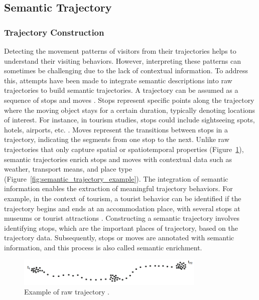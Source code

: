 \documentclass{article}
\begin{document}
\subsection{Semantic Trajectory}

\subsubsection{Trajectory Construction}
Detecting the movement patterns of visitors from their trajectories helps to understand their visiting behaviors. However, interpreting these patterns can sometimes be challenging due to the lack of contextual information. To address this, attempts have been made to integrate semantic descriptions into raw trajectories to build semantic trajectories. A trajectory can be assumed as a sequence of stops and moves \citep{spaccapietra_conceptual_2008}. Stops represent specific points along the trajectory where the moving object stays for a certain duration, typically denoting locations of interest. For instance, in tourism studies, stops could include sightseeing spots, hotels, airports, etc. \citep{yuan_review_2017}. Moves represent the transitions between stops in a trajectory, indicating the segments from one stop to the next. Unlike raw trajectories that only capture spatial or spatiotemporal properties (Figure~\ref{fig:raw_trajectory_example}), semantic trajectories enrich stops and moves with contextual data such as weather, transport means, and place type (Figure~\ref{fig:semantic_trajectory_example}). The integration of semantic information enables the extraction of meaningful trajectory behaviors. For example, in the context of tourism, a tourist behavior can be identified if the trajectory begins and ends at an accommodation place, with several stops at museums or tourist attractions \citep{parent_semantic_2013}. Constructing a semantic trajectory involves identifying stops, which are the important places of trajectory, based on the trajectory data. Subsequently, stops or moves are annotated with semantic information, and this process is also called semantic enrichment.

\begin{figure}
\centering
\includegraphics[width=0.8\textwidth]{figures/raw_trajectory_example.png}
\caption{\label{fig:raw_trajectory_example}Example of raw trajectory \citep{ferrero_mastermovelets_2020}.}
\end{figure}
\end{document}
